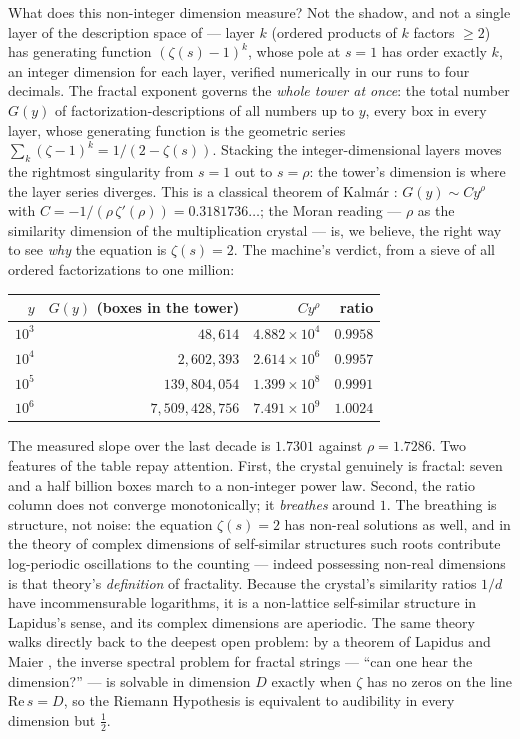 \documentclass[11pt]{article}
\theoremstyle{remark}
\begin{document}
What does this non-integer dimension measure? Not the shadow, and not a single layer of the
description space of \cite{CompanionI} --- layer $k$ (ordered products of $k$ factors $\ge 2$) has
generating function $(\zeta(s)-1)^k$, whose pole at $s = 1$ has order exactly $k$, an integer
dimension for each layer, verified numerically in our runs to four decimals. The fractal exponent
governs the \emph{whole tower at once}: the total number $G(y)$ of factorization-descriptions of all
numbers up to $y$, every box in every layer, whose generating function is the geometric series
$\sum_k (\zeta - 1)^k = 1/(2 - \zeta(s))$. Stacking the integer-dimensional layers moves the
rightmost singularity from $s = 1$ out to $s = \rho$: the tower's dimension is where the layer series
diverges. This is a classical theorem of Kalm\'ar \cite{Kalmar}: $G(y) \sim C y^{\rho}$ with
$C = -1/(\rho\, \zeta'(\rho)) = 0.3181736\ldots$; the Moran reading --- $\rho$ as the similarity
dimension of the multiplication crystal --- is, we believe, the right way to see \emph{why} the
equation is $\zeta(s) = 2$. The machine's verdict, from a sieve of all ordered factorizations to one
million:

\begin{center}
\begin{tabular}{rrrr}
\hline
$y$ & $G(y)$ (boxes in the tower) & $C y^{\rho}$ & ratio \\
\hline
$10^3$ & $48{,}614$ & $4.882 \times 10^4$ & $0.9958$ \\
$10^4$ & $2{,}602{,}393$ & $2.614 \times 10^6$ & $0.9957$ \\
$10^5$ & $139{,}804{,}054$ & $1.399 \times 10^8$ & $0.9991$ \\
$10^6$ & $7{,}509{,}428{,}756$ & $7.491 \times 10^9$ & $1.0024$ \\
\hline
\end{tabular}
\end{center}

\noindent The measured slope over the last decade is $1.7301$ against $\rho = 1.7286$. Two features
of the table repay attention. First, the crystal genuinely is fractal: seven and a half billion boxes
march to a non-integer power law. Second, the ratio column does not converge monotonically; it
\emph{breathes} around $1$. The breathing is structure, not noise: the equation $\zeta(s) = 2$ has
non-real solutions as well, and in the theory of complex dimensions of self-similar structures
\cite{LapidusBook} such roots contribute log-periodic oscillations to the counting --- indeed
possessing non-real dimensions is that theory's \emph{definition} of fractality. Because the
crystal's similarity ratios $1/d$ have incommensurable logarithms, it is a non-lattice self-similar
structure in Lapidus's sense, and its complex dimensions are aperiodic. The same theory walks
directly back to the deepest open problem: by a theorem of Lapidus and Maier \cite{LapidusMaier}, the
inverse spectral problem for fractal strings --- ``can one hear the dimension?'' --- is solvable in
dimension $D$ exactly when $\zeta$ has no zeros on the line $\mathrm{Re}\, s = D$, so the Riemann
Hypothesis is equivalent to audibility in every dimension but $\tfrac12$.
\end{document}
